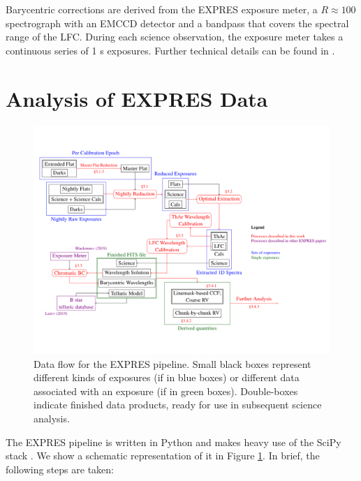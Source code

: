 Barycentric corrections are derived from the EXPRES exposure meter, a $R\approx100$ spectrograph with an EMCCD detector and a bandpass that covers the spectral range of the LFC. During each science observation, the exposure meter takes a continuous series of 1 s exposures. Further technical details can be found in \citet{blackman_measured_2019}.

\hypertarget{analysis-of-expres-data}{%
\section{Analysis of EXPRES Data}\label{analysis-of-expres-data}}

\begin{figure}
    \centering
    \includegraphics[width=\textwidth]{figures-4/pipeline}
    \caption[Data flow for the EXPRES pipeline]{Data flow for the EXPRES pipeline. Small black boxes represent different kinds of exposures (if in blue boxes) or different data associated with an exposure (if in green boxes). Double-boxes indicate finished data products, ready for use in subsequent science analysis.\label{fig:flowchart}}
\end{figure}

The EXPRES pipeline is written in Python and makes heavy use of the SciPy stack \citep{virtanen_scipy_2020}. We show a schematic representation of it in Figure \ref{fig:flowchart}. In brief, the following steps are taken:

